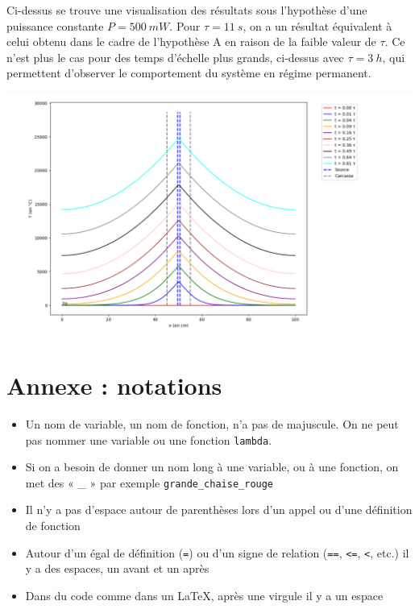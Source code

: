 \documentclass{article}
\newcommand{\p}{\texttt} %
\begin{document}
Ci-dessus se trouve une visualisation des résultats sous l'hypothèse d'une puissance constante $P = \SI{500}{mW}$. Pour $\tau = \SI{11}{s}$, on a un résultat équivalent à celui obtenu dans le cadre de l'hypothèse A en raison de la faible valeur de $\tau$. Ce n'est plus le cas pour des temps d'échelle plus grands, ci-dessus avec $\tau = \SI{3}{h}$, qui permettent d'observer le comportement du système en régime permanent.

\includegraphics[scale=0.37]{1dB_P500mW_t11000s.png}

\section*{Annexe : notations}

\begin{itemize}
    \item Un nom de variable, un nom de fonction, n'a pas de majuscule. On ne peut pas nommer une variable ou une fonction \p{lambda}.
    \item Si on a besoin de donner un nom long à une variable, ou à une fonction, on met des « \_ » par exemple \p{grande\_chaise\_rouge}
    \item Il n'y a pas d'espace autour de parenthèses lors d'un appel ou d'une définition de fonction
    \item Autour d'un égal de définition (\p{=}) ou d'un signe de relation (\p{==}, \p{<=}, \p{<}, etc.) il y a des espaces, un avant et un après
    \item Dans du code comme dans un \LaTeX, après une virgule il y a un espace
\end{itemize}
\end{document}
